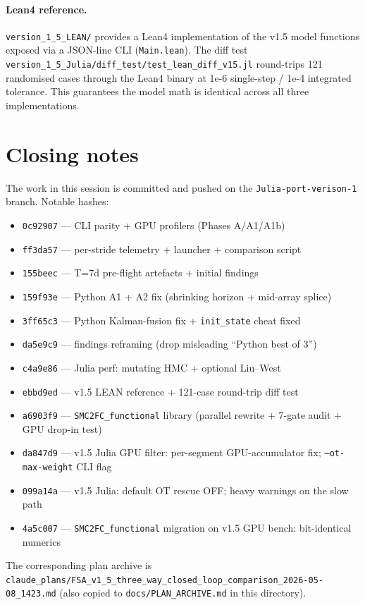 \documentclass[11pt,a4paper]{article}
\begin{document}
\paragraph{Lean4 reference.} \texttt{version\_1\_5\_LEAN/}
provides a Lean4 implementation of the v1.5 model functions
exposed via a JSON-line CLI (\texttt{Main.lean}). The diff test
\texttt{version\_1\_5\_Julia/diff\_test/test\_lean\_diff\_v15.jl}
round-trips 121 randomised cases through the Lean4 binary
at 1e-6 single-step / 1e-4 integrated tolerance. This guarantees
the model math is identical across all three implementations.

\section{Closing notes}

The work in this session is committed and pushed on the
\texttt{Julia-port-verison-1} branch. Notable hashes:

\begin{itemize}[itemsep=2pt]
  \item \texttt{0c92907} --- CLI parity + GPU profilers (Phases A/A1/A1b)
  \item \texttt{ff3da57} --- per-stride telemetry + launcher + comparison script
  \item \texttt{155beec} --- T=7d pre-flight artefacts + initial findings
  \item \texttt{159f93e} --- Python A1 + A2 fix (shrinking horizon + mid-array splice)
  \item \texttt{3ff65c3} --- Python Kalman-fusion fix + \texttt{init\_state} cheat fixed
  \item \texttt{da5e9c9} --- findings reframing (drop misleading ``Python best of 3'')
  \item \texttt{c4a9e86} --- Julia perf: mutating HMC + optional Liu--West
  \item \texttt{ebbd9ed} --- v1.5 LEAN reference + 121-case round-trip diff test
  \item \texttt{a6903f9} --- \texttt{SMC2FC\_functional} library (parallel rewrite + 7-gate audit + GPU drop-in test)
  \item \texttt{da847d9} --- v1.5 Julia GPU filter: per-segment GPU-accumulator fix; \texttt{--ot-max-weight} CLI flag
  \item \texttt{099a14a} --- v1.5 Julia: default OT rescue OFF; heavy warnings on the slow path
  \item \texttt{4a5c007} --- \texttt{SMC2FC\_functional} migration on v1.5 GPU bench: bit-identical numerics
\end{itemize}

The corresponding plan archive is
\texttt{claude\_plans/FSA\_v1\_5\_three\_way\_closed\_loop\_comparison\_2026-05-08\_1423.md}
(also copied to \texttt{docs/PLAN\_ARCHIVE.md} in this directory).
\end{document}
